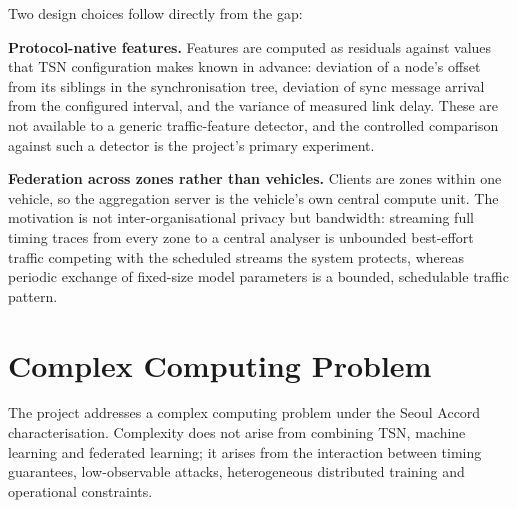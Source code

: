 Two design choices follow directly from the gap:

\textbf{Protocol-native features.} Features are computed as residuals against values
that TSN configuration makes known in advance: deviation of a node's offset from
its siblings in the synchronisation tree, deviation of sync message arrival from the
configured interval, and the variance of measured link delay. These are not available
to a generic traffic-feature detector, and the controlled comparison against such a
detector is the project's primary experiment.

\textbf{Federation across zones rather than vehicles.} Clients are zones within one
vehicle, so the aggregation server is the vehicle's own central compute unit. The
motivation is not inter-organisational privacy but bandwidth: streaming full timing
traces from every zone to a central analyser is unbounded best-effort traffic
competing with the scheduled streams the system protects, whereas periodic exchange
of fixed-size model parameters is a bounded, schedulable traffic pattern.

\section{Complex Computing Problem}

The project addresses a complex computing problem under the Seoul Accord
characterisation. Complexity does not arise from combining TSN, machine learning and
federated learning; it arises from the interaction between timing guarantees,
low-observable attacks, heterogeneous distributed training and operational
constraints.

